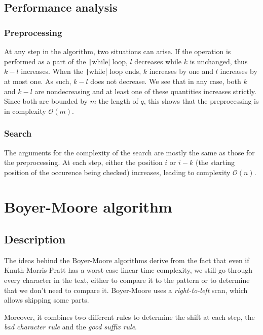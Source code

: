 \documentclass[a4paper,11pt,openany,extrafontsizes,twoside,article]{memoir}
\begin{document}
\section{Performance analysis}
\label{sec:performance-analysis}

\subsection{Preprocessing}
\label{sec:preprocessing-1}

At any step in the algorithm, two situations can arise. If the
operation is performed as a part of the \texttt|while| loop,
$l$ decreases while $k$ is unchanged, thus $k-l$ increases. When the
\texttt|while| loop ends, $k$ increases by one and $l$
increases by at most one. As such, $k-l$ does not decrease. We see
that in any case, both $k$ and $k-l$ are nondecreasing and at least
one of these quantities increases strictly. Since both are bounded by
$m$ the length of $q$, this shows that the preprocessing is in
complexity $\mathcal{O}(m)$.

\subsection{Search}
\label{sec:search-1}

The arguments for the complexity of the search are mostly the same as
those for the preprocessing. At each step, either the position $i$ or
$i-k$ (the starting position of the occurence being checked)
increases, leading to complexity $\mathcal{O}(n)$.


\chapter{Boyer-Moore algorithm}
\label{cha:boyer-moore-algor}

\section{Description}
\label{sec:description-2}

The ideas behind the Boyer-Moore algorithms derive from the fact that
even if Knuth-Morris-Pratt has a worst-case linear time complexity, we
still go through every character in the text, either to compare it to
the pattern or to determine that we don't need to compare
it. Boyer-Moore uses a \emph{right-to-left} scan, which allows
skipping some parts.

Moreover, it combines two different rules to determine the shift at
each step, the \emph{bad character rule} and the \emph{good suffix
  rule}.
\end{document}
